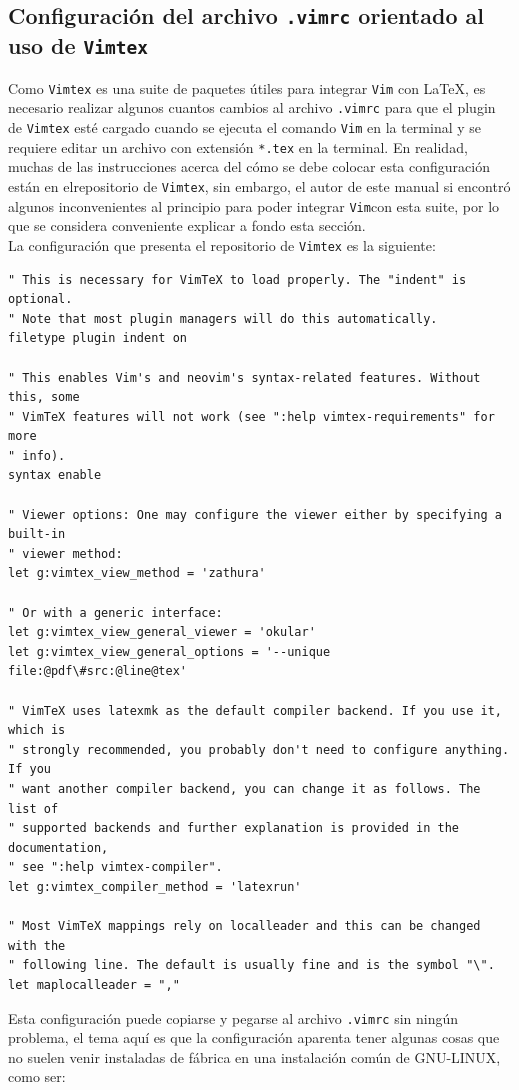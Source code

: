 \documentclass[10pt]{article}
\begin{document}
\subsection{Configuración del archivo \texttt{.vimrc} orientado al uso de \texttt{Vimtex}}
Como \texttt{Vimtex} es una suite de paquetes útiles para integrar \texttt{Vim} con \LaTeX, es necesario realizar algunos cuantos cambios al archivo \texttt{.vimrc} para que el plugin de \texttt{Vimtex} esté cargado cuando se ejecuta el comando \texttt{Vim} en la terminal y se requiere editar un archivo con extensión \texttt{*.tex} en la terminal. En realidad, muchas de las instrucciones acerca del cómo se debe colocar esta configuración están en elrepositorio de \texttt{Vimtex}, sin embargo, el autor de este manual si encontró algunos inconvenientes al principio para poder integrar \texttt{Vim}con esta suite, por lo que se considera conveniente explicar a fondo esta sección.\\
La configuración que presenta el repositorio de \texttt{Vimtex} es la siguiente:
\begin{verbatim}
" This is necessary for VimTeX to load properly. The "indent" is optional.
" Note that most plugin managers will do this automatically.
filetype plugin indent on

" This enables Vim's and neovim's syntax-related features. Without this, some
" VimTeX features will not work (see ":help vimtex-requirements" for more
" info).
syntax enable

" Viewer options: One may configure the viewer either by specifying a built-in
" viewer method:
let g:vimtex_view_method = 'zathura'

" Or with a generic interface:
let g:vimtex_view_general_viewer = 'okular'
let g:vimtex_view_general_options = '--unique file:@pdf\#src:@line@tex'

" VimTeX uses latexmk as the default compiler backend. If you use it, which is
" strongly recommended, you probably don't need to configure anything. If you
" want another compiler backend, you can change it as follows. The list of
" supported backends and further explanation is provided in the documentation,
" see ":help vimtex-compiler".
let g:vimtex_compiler_method = 'latexrun'

" Most VimTeX mappings rely on localleader and this can be changed with the
" following line. The default is usually fine and is the symbol "\".
let maplocalleader = ","	
\end{verbatim}
Esta configuración puede copiarse y pegarse al archivo \texttt{.vimrc} sin ningún problema, el tema aquí es que la configuración aparenta tener algunas cosas que no suelen venir instaladas de fábrica en una instalación común de GNU-LINUX, como ser:
\end{document}
